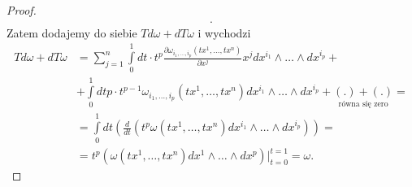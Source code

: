 \documentclass[../main.tex]{subfiles}
\begin{document}
\begin{proof}
\begin{align*}
.\end{align*}
Zatem dodajemy do siebie $Td\omega + dT\omega$ i wychodzi
\begin{align*}
    Td\omega + dT\omega &= \sum_{j = 1}^n\int\limits_0^1dt\cdot t^p \frac{\partial \omega_{i_1,\ldots,i_p}(tx^1,\ldots,tx^n)}{\partial x^j} x^j dx^{i_1}\land \ldots\land dx^{i_p} +\\
    &+ \int\limits_0^1dt p\cdot t^{p-1}\omega_{i_1,\ldots,i_p}(tx^1,\ldots,tx^n)dx^{i_1}\land \ldots\land dx^{i_p} + \underset{\text{równa się zero}}{\left( . \right) + \left( . \right)} = \\
    &= \int\limits_0^1dt\left(\frac{d}{dt}\left( t^p \omega(tx^1,\ldots,tx^n)dx^{i_1}\land \ldots\land dx^{i_p}\right)\right) =\\
    &= t^p\left(\omega(tx^1,\ldots,tx^n)dx^1\land\ldots\land dx^p\right)\Bigg|_{t = 0}^{t = 1} = \omega
.\end{align*}

\end{proof}
\end{document}
